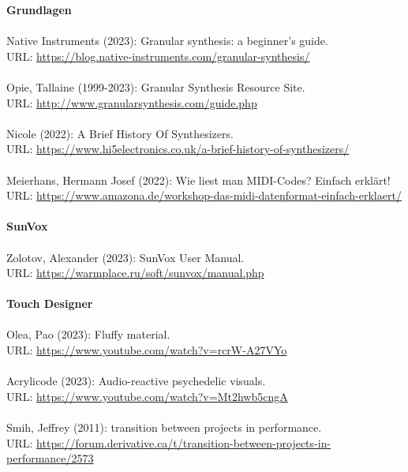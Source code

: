 \documentclass[12pt]{scrartcl}%
\theoremstyle{nonumberplain}
\begin{document}
\textbf{Grundlagen}
\\\\
Native Instruments (2023): Granular synthesis: a beginner’s guide.\\
URL: \href{https://blog.native-instruments.com/granular-synthesis/}{https://blog.native-instruments.com/granular-synthesis/}
\\\\
Opie, Tallaine (1999-2023): Granular Synthesis Resource Site.\\
URL: \href{http://www.granularsynthesis.com/guide.php}{http://www.granularsynthesis.com/guide.php}
\\\\
Nicole (2022): A Brief History Of Synthesizers.\\
URL: \href{https://www.hi5electronics.co.uk/a-brief-history-of-synthesizers/}{https://www.hi5electronics.co.uk/a-brief-history-of-synthesizers/}
\\\\
Meierhans, Hermann Josef (2022): Wie liest man MIDI-Codes? Einfach erklärt!\\
URL: \href{https://www.amazona.de/workshop-das-midi-datenformat-einfach-erklaert/}{https://www.amazona.de/workshop-das-midi-datenformat-einfach-erklaert/}
\\\\
\textbf{SunVox}
\\\\
Zolotov, Alexander (2023): SunVox User Manual.\\
URL: \href{https://warmplace.ru/soft/sunvox/manual.php}{https://warmplace.ru/soft/sunvox/manual.php}
\\\\
\textbf{Touch Designer}
\\\\
Olea, Pao (2023): Fluffy material.\\
URL: \href{https://www.youtube.com/watch?v=rcrW-A27VYo}{https://www.youtube.com/watch?v=rcrW-A27VYo}
\\\\
Acrylicode (2023): Audio-reactive psychedelic visuals.\\
URL: \href{https://www.youtube.com/watch?v=Mt2hwb5cngA}{https://www.youtube.com/watch?v=Mt2hwb5cngA}
\\\\
Smih, Jeffrey (2011): transition between projects in performance.\\
URL: \href{https://forum.derivative.ca/t/transition-between-projects-in-performance/2573}{https://forum.derivative.ca/t/transition-between-projects-in-performance/2573}
\end{document}
